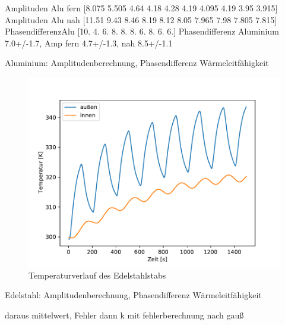 Amplituden Alu fern [8.075 5.505 4.64  4.18  4.28  4.19  4.095 4.19  3.95  3.915]
Amplituden Alu nah [11.51   9.43   8.46   8.19   8.12   8.05   7.965  7.98   7.805  7.815]
PhasendifferenzAlu [10.  4.  6.  8.  8.  8.  6.  8.  6.  6.]
Phasendifferenz Aluminium 7.0+/-1.7, Amp fern 4.7+/-1.3, nah 8.5+/-1.1

Aluminium: Amplitudenberechnung, Phasendifferenz
Wärmeleitfähigkeit



\begin{figure}[!htbp]
  \centering
  \includegraphics{content/dyn_2.pdf}
  \caption{Temperaturverlauf des Edelstahlstabs}
  \label{fig:edel_dyn}
\end{figure}

Edelstahl: Amplitudenberechnung, Phasendifferenz
Wärmeleitfähigkeit



daraus mittelwert, Fehler
dann k mit fehlerberechnung nach gauß

